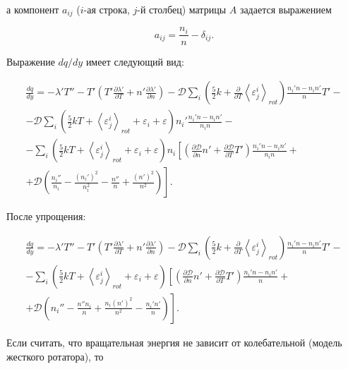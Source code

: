 \documentclass[12pt]{article}
\begin{document}
а компонент $a_{ij}$ ($i$-ая строка, $j$-й столбец) матрицы $A$ задается выражением

\begin{equation}
  a_{ij} = \frac{n_{i}}{n} - \delta_{ij}.
\end{equation}

Выражение $d q / dy$ имеет следующий вид:

\begin{multline}
  \frac{d q}{d y} = -\lambda' T'' - T' \left(T' \frac{\partial \lambda'}{\partial T} + n' \frac{\partial \lambda'}{\partial n} \right) - \mathcal{D} \sum_{i}\left(\frac{5}{2}k + \frac{\partial}{\partial T}\left<\varepsilon^{i}_{j}\right>_{rot} \right)\frac{n_{i}'n - n_{i}n'}{n}T' - \\
  - \mathcal{D} \sum_{i}\left(\frac{5}{2}kT + \left<\varepsilon^{i}_{j} \right>_{rot} + \varepsilon_{i} + \varepsilon \right) n_{i}'\frac{n_{i}'n - n_{i}n'}{n_{i}n}
  - \\
  - \sum_{i}\left(\frac{5}{2}kT + \left<\varepsilon^{i}_{j} \right>_{rot} + \varepsilon_{i} + \varepsilon \right) n_{i}\left[\left(\frac{\partial \mathcal{D}}{\partial n}n' + \frac{\partial \mathcal{D}}{\partial T}T' \right) \frac{n_{i}'n - n_{i}n'}{n_{i}n} + \right. \\ + \left. \mathcal{D}\left(\frac{n_{i}''}{n_{i}} - \frac{\left(n_{i}'\right)^2}{n_{i}^2} - \frac{n''}{n} + \frac{\left(n'\right)^2}{n^2} \right) \right].
\end{multline}

После упрощения:

\begin{multline}
  \frac{d q}{d y} = -\lambda' T'' - T' \left(T' \frac{\partial \lambda'}{\partial T} + n' \frac{\partial \lambda'}{\partial n} \right) - \mathcal{D} \sum_{i}\left(\frac{5}{2}k + \frac{\partial}{\partial T}\left<\varepsilon^{i}_{j}\right>_{rot} \right)\frac{n_{i}'n - n_{i}n'}{n}T' - \\
  - \sum_{i} \left(\frac{5}{2}kT + \left<\varepsilon^{i}_{j} \right>_{rot} + \varepsilon_{i} + \varepsilon \right) \left[\left(\frac{\partial \mathcal{D}}{\partial n}n' + \frac{\partial \mathcal{D}}{\partial T}T' \right) \frac{n_{i}'n - n_{i}n'}{n} \right. + \\
  + \left. \mathcal{D}\left(n_{i}'' - \frac{n''n_{i}}{n} + \frac{n_{i}\left(n'\right)^2}{n^2} - \frac{n_{i}'n'}{n} \right)  \right].
\end{multline}

Если считать, что вращательная энергия не зависит от колебательной (модель жесткого ротатора), то
\end{document}
